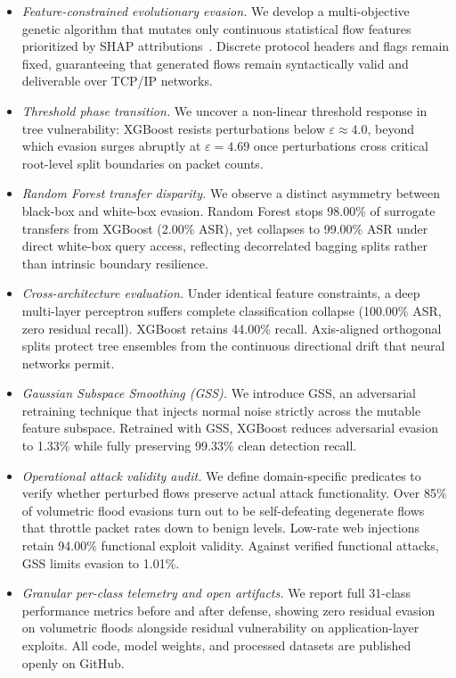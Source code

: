 \documentclass[iicol,pdflatex,sn-mathphys-num]{sn-jnl}
\begin{document}
\begin{itemize}
    \item \textit{Feature-constrained evolutionary evasion.} We develop a multi-objective genetic algorithm that mutates only continuous statistical flow features prioritized by SHAP attributions~\cite{lundberg2017shap}. Discrete protocol headers and flags remain fixed, guaranteeing that generated flows remain syntactically valid and deliverable over TCP/IP networks.
    \item \textit{Threshold phase transition.} We uncover a non-linear threshold response in tree vulnerability: XGBoost resists perturbations below $\varepsilon \approx 4.0$, beyond which evasion surges abruptly at $\varepsilon = 4.69$ once perturbations cross critical root-level split boundaries on packet counts.
    \item \textit{Random Forest transfer disparity.} We observe a distinct asymmetry between black-box and white-box evasion. Random Forest stops 98.00\% of surrogate transfers from XGBoost (2.00\% ASR), yet collapses to 99.00\% ASR under direct white-box query access, reflecting decorrelated bagging splits rather than intrinsic boundary resilience.
    \item \textit{Cross-architecture evaluation.} Under identical feature constraints, a deep multi-layer perceptron suffers complete classification collapse (100.00\% ASR, zero residual recall). XGBoost retains 44.00\% recall. Axis-aligned orthogonal splits protect tree ensembles from the continuous directional drift that neural networks permit.
    \item \textit{Gaussian Subspace Smoothing (GSS).} We introduce GSS, an adversarial retraining technique that injects normal noise strictly across the mutable feature subspace. Retrained with GSS, XGBoost reduces adversarial evasion to 1.33\% while fully preserving 99.33\% clean detection recall.
    \item \textit{Operational attack validity audit.} We define domain-specific predicates to verify whether perturbed flows preserve actual attack functionality. Over 85\% of volumetric flood evasions turn out to be self-defeating degenerate flows that throttle packet rates down to benign levels. Low-rate web injections retain 94.00\% functional exploit validity. Against verified functional attacks, GSS limits evasion to 1.01\%.
    \item \textit{Granular per-class telemetry and open artifacts.} We report full 31-class performance metrics before and after defense, showing zero residual evasion on volumetric floods alongside residual vulnerability on application-layer exploits. All code, model weights, and processed datasets are published openly on GitHub.
\end{itemize}
\end{document}
